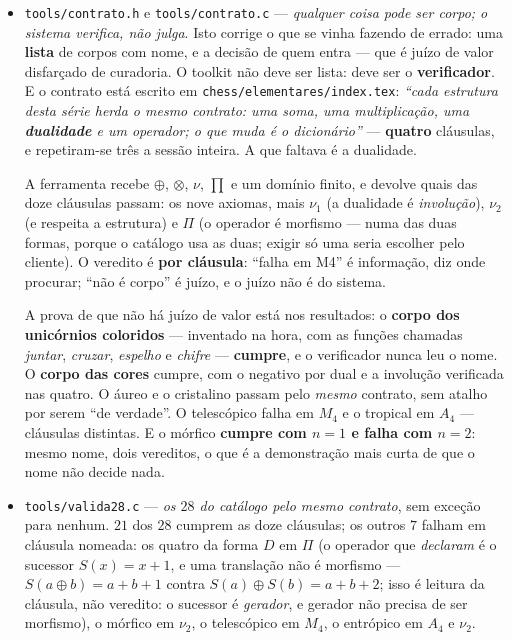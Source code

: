 \documentclass[11pt]{article}
\newcommand{\code}[1]{\texttt{\small #1}}
\theoremstyle{plain}
\theoremstyle{remark}
\begin{document}
\begin{itemize}
E a distinção que uma tabela bonita não pode apagar: \textbf{cinco corpos estão
implementados} --- áureo, cristalino, racional, mórfico, mecânico, com as três operações em C e
medidor a fechá-las --- e os outros $23$ estão \textbf{reduzidos}: a forma do seu $\prod$ está
medida, mas a \emph{régua} própria de cada um (a impedância do eletromagnético, o campo médio do
celeste, Friedmann no cósmico) está certificada no catálogo, não aqui. O catálogo já o diz: ``a
multiplicação é uma só; a norma é específica da régua''. A multiplicação está fechada para os $28$.
Dizer que os $28$ estão implementados aqui seria medir a fatia e afirmar o todo.
\item \code{tools/contrato.h} e \code{tools/contrato.c} --- \emph{qualquer coisa pode ser
corpo; o sistema verifica, não julga}. Isto corrige o que se vinha fazendo de errado: uma
\textbf{lista} de corpos com nome, e a decisão de quem entra --- que é juízo de valor disfarçado
de curadoria. O toolkit não deve ser lista: deve ser o \textbf{verificador}. E o contrato está
escrito em \code{chess/elementares/index.tex}: \emph{``cada estrutura desta série herda o mesmo
contrato: uma soma, uma multiplicação, uma \textbf{dualidade} e um operador; o que muda é o
dicionário''} --- \textbf{quatro} cláusulas, e repetiram-se três a sessão inteira. A que faltava é a
dualidade.

A ferramenta recebe $\oplus$, $\otimes$, $\nu$, $\prod$ e um domínio finito, e devolve quais das
doze cláusulas passam: os nove axiomas, mais $\nu_1$ (a dualidade é \emph{involução}), $\nu_2$
(e respeita a estrutura) e $\Pi$ (o operador é morfismo --- numa das duas formas, porque o catálogo
usa as duas; exigir só uma seria escolher pelo cliente). O veredito é \textbf{por cláusula}:
``falha em M4'' é informação, diz onde procurar; ``não é corpo'' é juízo, e o juízo não é do
sistema.

A prova de que não há juízo de valor está nos resultados: o \textbf{corpo dos unicórnios
coloridos} --- inventado na hora, com as funções chamadas \emph{juntar}, \emph{cruzar},
\emph{espelho} e \emph{chifre} --- \textbf{cumpre}, e o verificador nunca leu o nome. O
\textbf{corpo das cores} cumpre, com o negativo por dual e a involução verificada nas quatro. O
áureo e o cristalino passam pelo \emph{mesmo} contrato, sem atalho por serem ``de verdade''. O
telescópico falha em $M_4$ e o tropical em $A_4$ --- cláusulas distintas. E o mórfico
\textbf{cumpre com $n=1$ e falha com $n=2$}: mesmo nome, dois vereditos, o que é a demonstração
mais curta de que o nome não decide nada.
\item \code{tools/valida28.c} --- \emph{os $28$ do catálogo pelo mesmo contrato}, sem exceção
para nenhum. $21$ dos $28$ cumprem as doze cláusulas; os outros $7$ falham em cláusula nomeada:
os quatro da forma $D$ em $\Pi$ (o operador que \emph{declaram} é o sucessor $S(x)=x+1$, e uma
translação não é morfismo --- $S(a{\oplus}b) = a{+}b{+}1$ contra $S(a){\oplus}S(b) = a{+}b{+}2$;
isso é leitura da cláusula, não veredito: o sucessor é \emph{gerador}, e gerador não precisa de
ser morfismo), o mórfico em $\nu_2$, o telescópico em $M_4$, o entrópico em $A_4$ e $\nu_2$.


\end{itemize}
\end{document}
